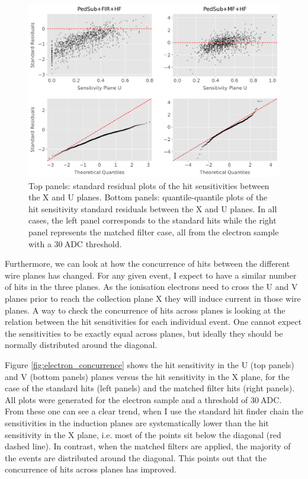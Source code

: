 \begin{figure}[t]
	\centering
	\includegraphics[width=.99\linewidth]{Images/Matched_Filter/hit_study_electron_residuals}
	\caption[Standard residuals and quantile-quantile plots for the hit sensitivity of the X and U planes.]{Top panels: standard residual plots of the hit sensitivities between the X and U planes. Bottom panels: quantile-quantile plots of the hit sensitivity standard residuals between the X and U planes. In all cases, the left panel corresponds to the standard hits while the right panel represents the matched filter case, all from the electron sample with a $30 \ \mathrm{ADC}$ threshold.}
	\label{fig:electron_residuals}
\end{figure}

Furthermore, we can look at how the concurrence of hits between the different wire planes has changed. For any given event, I expect to have a similar number of hits in the three planes. As the ionisation electrons need to cross the U and V planes prior to reach the collection plane X they will induce current in those wire planes. A way to check the concurrence of hits across planes is looking at the relation between the hit sensitivities for each individual event. One cannot expect the sensitivities to be exactly equal across planes, but ideally they should be normally distributed around the diagonal.

Figure \ref{fig:electron_concurrence} shows the hit sensitivity in the U (top panels) and V (bottom panels) planes versus the hit sensitivity in the X plane, for the case of the standard hits (left panels) and the matched filter hits (right panels). All plots were generated for the electron sample and a threshold of $30 \ \mathrm{ADC}$. From these one can see a clear trend, when I use the standard hit finder chain the sensitivities in the induction planes are systematically lower than the hit sensitivity in the X plane, i.e. most of the points sit below the diagonal (red dashed line). In contrast, when the matched filters are applied, the majority of the events are distributed around the diagonal. This points out that the concurrence of hits across planes has improved.


